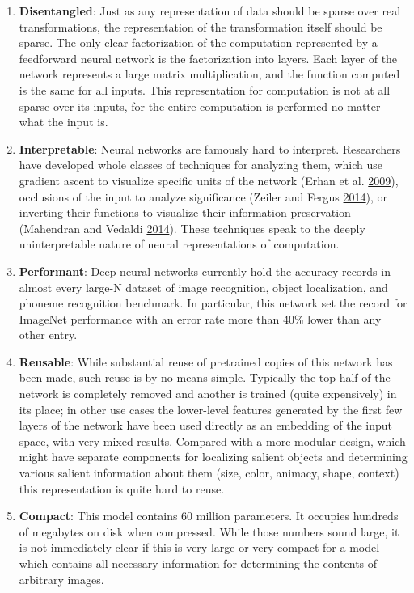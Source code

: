 \documentclass[12pt,twoside]{mitthesis}
\begin{document}
\begin{enumerate}
\def\labelenumi{\arabic{enumi}.}
\item
  \textbf{Disentangled}: Just as any representation of data should be
  sparse over real transformations, the representation of the
  transformation itself should be sparse. The only clear factorization
  of the computation represented by a feedforward neural network is the
  factorization into layers. Each layer of the network represents a
  large matrix multiplication, and the function computed is the same for
  all inputs. This representation for computation is not at all sparse
  over its inputs, for the entire computation is performed no matter
  what the input is.
\item
  \textbf{Interpretable}: Neural networks are famously hard to
  interpret. Researchers have developed whole classes of techniques for
  analyzing them, which use gradient ascent to visualize specific units
  of the network (Erhan et al.
  \protect\hyperlink{ref-erhan2009visualizing}{2009}), occlusions of the
  input to analyze significance (Zeiler and Fergus
  \protect\hyperlink{ref-zeiler2014visualizing}{2014}), or inverting
  their functions to visualize their information preservation (Mahendran
  and Vedaldi \protect\hyperlink{ref-mahendran2014understanding}{2014}).
  These techniques speak to the deeply uninterpretable nature of neural
  representations of computation.
\item
  \textbf{Performant}: Deep neural networks currently hold the accuracy
  records in almost every large-N dataset of image recognition, object
  localization, and phoneme recognition benchmark. In particular, this
  network set the record for ImageNet performance with an error rate
  more than 40\% lower than any other entry.
\item
  \textbf{Reusable}: While substantial reuse of pretrained copies of
  this network has been made, such reuse is by no means simple.
  Typically the top half of the network is completely removed and
  another is trained (quite expensively) in its place; in other use
  cases the lower-level features generated by the first few layers of
  the network have been used directly as an embedding of the input
  space, with very mixed results. Compared with a more modular design,
  which might have separate components for localizing salient objects
  and determining various salient information about them (size, color,
  animacy, shape, context) this representation is quite hard to reuse.
\item
  \textbf{Compact}: This model contains 60 million parameters. It
  occupies hundreds of megabytes on disk when compressed. While those
  numbers sound large, it is not immediately clear if this is very large
  or very compact for a model which contains all necessary information
  for determining the contents of arbitrary images.
\end{enumerate}
\end{document}
